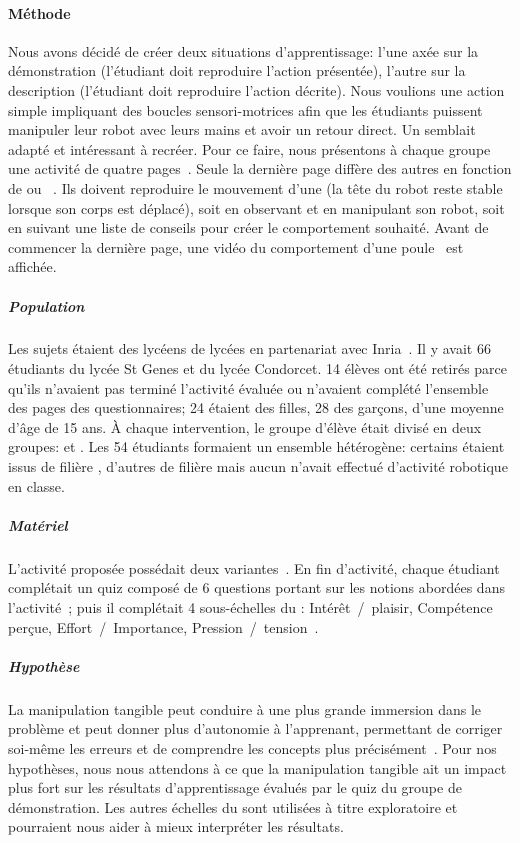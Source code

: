         \paragraph{Méthode}
            Nous avons décidé de créer deux situations d'apprentissage: l'une axée sur la démonstration (l'étudiant doit reproduire l'action présentée), l'autre sur la description (l'étudiant doit reproduire l'action décrite). Nous voulions une action simple impliquant des boucles sensori-motrices afin que les étudiants puissent manipuler leur robot avec leurs mains et avoir un retour direct. Un  semblait adapté et intéressant à recréer.
            Pour ce faire, nous présentons à chaque groupe une activité de quatre pages~. Seule la dernière page diffère des autres en fonction de  ou ~. Ils doivent reproduire le mouvement d'une  (la tête du robot reste stable lorsque son corps est déplacé), soit en observant et en manipulant son robot, soit en suivant une liste de conseils pour créer le comportement souhaité. Avant de commencer la dernière page, une vidéo du comportement d'une poule~  est affichée.
            \subparagraph{Population}
                Les sujets étaient des lycéens de lycées en partenariat avec Inria~.
                Il y avait 66 étudiants du lycée St Genes et du lycée Condorcet. 14 élèves ont été retirés parce qu'ils n'avaient pas terminé l'activité évaluée ou n'avaient complété l'ensemble des pages des questionnaires; 24 étaient des filles, 28 des garçons, d'une moyenne d'âge de 15 ans. À chaque intervention, le groupe d'élève était divisé en deux groupes:  et . Les 54 étudiants formaient un ensemble hétérogène: certains étaient issus de filière , d'autres de filière  mais aucun n'avait effectué d'activité robotique en classe.
            \subparagraph{Matériel}
                L'activité proposée possédait deux variantes~. En fin d'activité, chaque étudiant complétait un quiz composé de 6 questions portant sur les notions abordées dans l'activité~; puis il complétait 4 sous-échelles du : Intérêt~/~plaisir, Compétence perçue, Effort~/~Importance, Pression~/~tension~.
            \subparagraph{Hypothèse}
                La manipulation tangible peut conduire à une plus grande immersion dans le problème et peut donner plus d'autonomie à l'apprenant, permettant de corriger soi-même les erreurs et de comprendre les concepts plus précisément~. Pour nos hypothèses, nous nous attendons à ce que la manipulation tangible ait un impact plus fort sur les résultats d'apprentissage évalués par le quiz du groupe de démonstration. Les autres échelles du  sont utilisées à titre exploratoire et pourraient nous aider à mieux interpréter les résultats.
